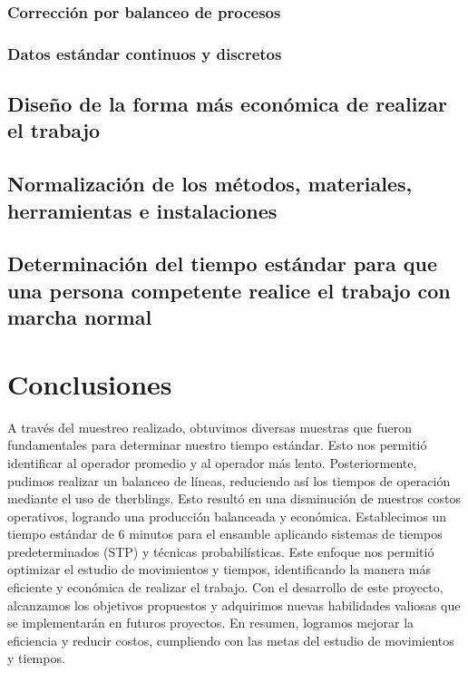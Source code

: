     \subsubsection{Corrección por balanceo de procesos}
    \subsubsection{Datos estándar continuos y discretos}
    \subsection{Diseño de la forma más económica de realizar el trabajo}
    
    \subsection{Normalización de los métodos, materiales, herramientas e instalaciones}
    
    \subsection{Determinación del tiempo estándar para que una persona competente realice el trabajo con marcha normal}
    
    
    \section{Conclusiones}
    A través del muestreo realizado, obtuvimos diversas muestras que fueron fundamentales para determinar nuestro tiempo estándar. Esto nos permitió identificar al operador promedio y al operador más lento. Posteriormente, pudimos realizar un balanceo de líneas, reduciendo así los tiempos de operación mediante el uso de therblings. Esto resultó en una disminución de nuestros costos operativos, logrando una producción balanceada y económica. Establecimos un tiempo estándar de 6 minutos para el ensamble aplicando sistemas de tiempos predeterminados (STP) y técnicas probabilísticas. Este enfoque nos permitió optimizar el estudio de movimientos y tiempos, identificando la manera más eficiente y económica de realizar el trabajo. 
    Con el desarrollo de este proyecto, alcanzamos los objetivos propuestos y adquirimos nuevas habilidades valiosas que se implementarán en futuros proyectos. En resumen, logramos mejorar la eficiencia y reducir costos, cumpliendo con las metas del estudio de movimientos y tiempos.
    
